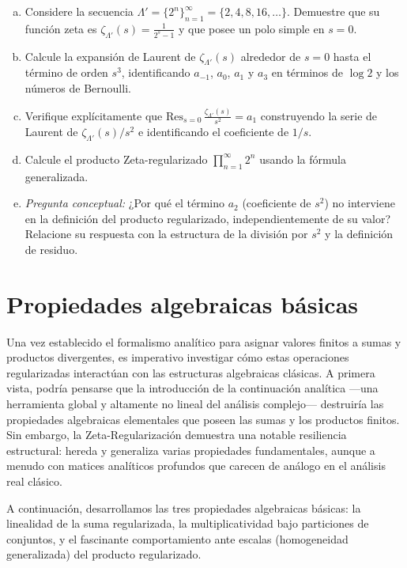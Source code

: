 \begin{enumerate}[a)]
    \item Considere la secuencia $\Lambda' = \{2^n\}_{n=1}^{\infty} = \{2, 4, 8, 16, \ldots\}$. Demuestre que su función zeta es $\zeta_{\Lambda'}(s) = \frac{1}{2^s - 1}$ y que posee un polo simple en $s=0$.
    \item Calcule la expansión de Laurent de $\zeta_{\Lambda'}(s)$ alrededor de $s=0$ hasta el término de orden $s^3$, identificando $a_{-1}$, $a_0$, $a_1$ y $a_3$ en términos de $\log 2$ y los números de Bernoulli.
    \item Verifique explícitamente que $\text{Res}_{s=0}\,\frac{\zeta_{\Lambda'}(s)}{s^2} = a_1$ construyendo la serie de Laurent de $\zeta_{\Lambda'}(s)/s^2$ e identificando el coeficiente de $1/s$.
    \item Calcule el producto Zeta-regularizado $\prod_{n=1}^{\infty} 2^n$ usando la fórmula generalizada.
    \item \textit{Pregunta conceptual:} ¿Por qué el término $a_2$ (coeficiente de $s^2$) no interviene en la definición del producto regularizado, independientemente de su valor? Relacione su respuesta con la estructura de la división por $s^2$ y la definición de residuo.
\end{enumerate}



\section{Propiedades algebraicas básicas}

Una vez establecido el formalismo analítico para asignar valores finitos a sumas y productos divergentes, es imperativo investigar cómo estas operaciones regularizadas interactúan con las estructuras algebraicas clásicas. A primera vista, podría pensarse que la introducción de la continuación analítica —una herramienta global y altamente no lineal del análisis complejo— destruiría las propiedades algebraicas elementales que poseen las sumas y los productos finitos. Sin embargo, la Zeta-Regularización demuestra una notable resiliencia estructural: hereda y generaliza varias propiedades fundamentales, aunque a menudo con matices analíticos profundos que carecen de análogo en el análisis real clásico.

A continuación, desarrollamos las tres propiedades algebraicas básicas: la linealidad de la suma regularizada, la multiplicatividad bajo particiones de conjuntos, y el fascinante comportamiento ante escalas (homogeneidad generalizada) del producto regularizado.

